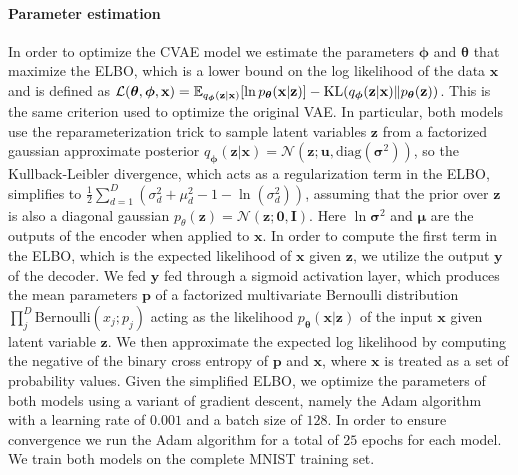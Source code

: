 \paragraph{Parameter estimation}
In order to optimize the CVAE model we estimate the parameters $\bm{\phi}$ and $\bm{\theta}$ that maximize the ELBO, which is a lower bound on the log likelihood of the data $\mathbf{x}$ and is defined as $\mathcal{L}(\bm{\theta}, \bm{\phi}, \mathbf{x}) = \E_{q_{\bm{\phi}}(\mathbf{z}|\mathbf{x})}{\lrs{\ln{p_{\bm{\theta}}(\mathbf{x} |\mathbf{z} )}}} - \KL (q_{\bm{\phi}}(\mathbf{z}|\mathbf{x}) \lVert p_{\bm{\theta}}(\mathbf{z}) )$. This is the same criterion used to optimize the original VAE\@. In particular, both models use the reparameterization trick to sample latent variables $\mathbf{z}$ from a factorized gaussian approximate posterior $q_{\bm{\phi}}(\mathbf{z}|\mathbf{x}) = \mathcal{N}(\mathbf{z}; \mathbf{u}, \text{diag}(\bm{\sigma}^2))$, so the Kullback-Leibler divergence, which acts as a regularization term in the ELBO, simplifies to $\frac{1}{2}\sum_{d=1}^{D}(\sigma_d^2 + \mu_d^2 - 1 - \ln(\sigma_d^2))$, assuming that the prior over $\mathbf{z}$ is also a diagonal gaussian $p_{\theta}(\mathbf{z}) = \mathcal{N}(\mathbf{z};\mathbf{0}, \mathbf{I})$. Here $\ln{\bm{\sigma}^2}$ and $\bm{\mu}$ are the outputs of the encoder when applied to $\mathbf{x}$. In order to compute the first term in the ELBO, which is the expected likelihood of $\mathbf{x}$ given $\mathbf{z}$, we utilize the output $\mathbf{y}$ of the decoder. We fed $\mathbf{y}$ fed through a sigmoid activation layer, which produces the mean parameters $\mathbf{p}$ of a factorized multivariate Bernoulli distribution $\prod_j^{D} \text{Bernoulli}(x_j; p_j)$ acting as the likelihood $p_{\bm{\theta}}(\mathbf{x} |\mathbf{z} )$ of the input $\mathbf{x}$ given latent variable $\mathbf{z}$. \iffalse As such, one may regard both VAE models as making the simplifying assumption that the MNIST data is binary, which is not technically the case. The simplifying assumption is most likely warranted given that the vast majority of pixels in the MNIST dataset are in fact either $0$ or $1$. Given this simplification , \fi We then approximate  the expected log likelihood by computing the negative of the binary cross entropy of $\mathbf{p}$ and $\mathbf{x}$, where $\mathbf{x}$ is treated as a set of probability values. Given the simplified ELBO, we optimize the parameters of both models using a variant of gradient descent, namely the Adam algorithm with a learning rate of $0.001$ and a batch size of $128$. In order to ensure convergence we run the Adam algorithm for a total of $25$ epochs for each model. We train both models on the complete MNIST training set.

